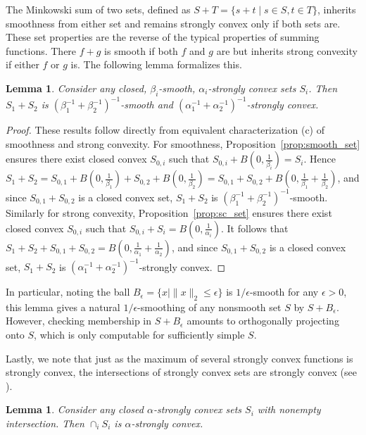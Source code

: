 \documentclass[sn-mathphys,Numbered]{sn-jnl}%
\newtheorem{lemma}[theorem]{Lemma}%
\begin{document}
 The Minkowski sum of two sets, defined as $S+T=\{s+t \mid s\in S, t\in T\}$, inherits smoothness from either set and remains strongly convex only if both sets are. These set properties are the reverse of the typical properties of summing functions. There $f+g$ is smooth if both $f$ and $g$ are but inherits strong convexity if either $f$ or $g$ is. The following lemma formalizes this.
\begin{lemma} \label{lemma:mink_sum}
   Consider any closed, $\beta_i$-smooth, $\alpha_i$-strongly convex sets $S_i$. Then $S_1+S_2$ is $(\beta_1^{-1}+\beta_2^{-1})^{-1}$-smooth and $(\alpha_1^{-1}+\alpha_2^{-1})^{-1}$-strongly convex.
\end{lemma}
\begin{proof}
    These results follow directly from equivalent characterization (c) of smoothness and strong convexity. For smoothness, Proposition~\ref{prop:smooth_set} ensures there exist closed convex $S_{0,i}$ such that $S_{0,i}+B(0,\frac{1}{\beta_i})=S_i$. Hence $S_1+S_2=S_{0,1}+B(0,\frac{1}{\beta_1})+S_{0,2}+B(0,\frac{1}{\beta_2})=S_{0,1}+S_{0,2}+B(0,\frac{1}{\beta_1}+\frac{1}{\beta_2})$, and since $S_{0,1}+S_{0,2}$ is a closed convex set, $S_1+S_2$ is $( \beta_1^{-1}+\beta_2^{-1})^{-1}$-smooth. Similarly for strong convexity, Proposition~\ref{prop:sc_set} ensures there exist closed convex $S_{0,i}$ such that $S_{0,i}+S_i = B(0,\frac{1}{\alpha_i})$. It follows that $S_1+S_2+S_{0,1}+S_{0,2} = B(0,\frac{1}{\alpha_1}+\frac{1}{\alpha_2})$, and since $S_{0,1}+S_{0,2}$ is a closed convex set, $S_1+S_2$ is $( \alpha_1^{-1}+\alpha_2^{-1})^{-1}$-strongly convex.
\end{proof}
\noindent In particular, noting the ball $B_\epsilon=\{x\mid \|x\|_2\leq \epsilon\}$ is $1/\epsilon$-smooth for any $\epsilon>0$, this lemma gives a natural $1/\epsilon$-smoothing of any nonsmooth set $S$ by $S+B_\epsilon$. However, checking membership in $S+B_\epsilon$ amounts to orthogonally projecting onto $S$, which is only computable for sufficiently simple $S$. 

 Lastly, we note that just as the maximum of several strongly convex functions is strongly convex, the intersections of strongly convex sets are strongly convex (see \cite[Proposition 2]{vial1982strong}).
\begin{lemma}
Consider any closed $\alpha$-strongly convex sets $S_i$ with nonempty intersection. Then $\cap_i S_i$ is $\alpha$-strongly convex.
\end{lemma}
\end{document}
